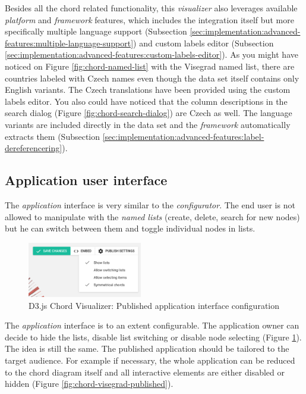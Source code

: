 Besides all the chord related functionality, this \emph{visualizer} also leverages available \emph{platform} and \emph{framework} features, which includes the integration itself but more specifically multiple language support (Subsection \ref{sec:implementation:advanced-features:multiple-language-support}) and custom labels editor (Subsection \ref{sec:implementation:advanced-features:custom-labels-editor}). As you might have noticed on Figure \ref{fig:chord-named-list} with the Visegrad named list, there are countries labeled with Czech names even though the data set itself contains only English variants. The Czech translations have been provided using the custom labels editor. You also could have noticed that the column descriptions in the search dialog (Figure \ref{fig:chord-search-dialog}) are Czech as well. The language variants are included directly in the data set and the \emph{framework} automatically extracts them (Subsection \ref{sec:implementation:advanced-features:label-dereferencering}).

\subsection{Application user interface}

The \emph{application} interface is very similar to the \emph{configurator}. The end user is not allowed to manipulate with the \emph{named lists} (create, delete, search for new nodes) but he can switch between them and toggle individual nodes in lists. 


\begin{figure}
	\centering
	\includegraphics[width=50mm]{img/06_chord_publish_configuration_interface}
	\caption{D3.js Chord Visualizer: Published application interface configuration}
    \label{fig:chord-publish-configuration-interface}
\end{figure}

The \emph{application} interface is to an extent configurable. The application owner can decide to hide the lists, disable list switching or disable node selecting (Figure \ref{fig:chord-publish-configuration-interface}). The idea is still the same. The published application should be tailored to the target audience. For example if necessary, the whole application can be reduced to the chord diagram itself and all interactive elements are either disabled or hidden (Figure \ref{fig:chord-visegrad-published}).

